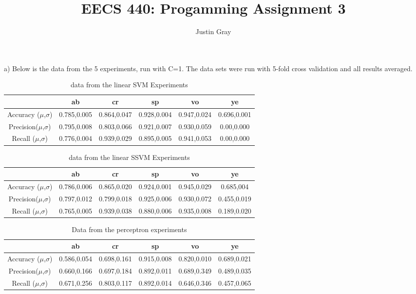 \documentclass[12pt]{article}
\title{EECS 440: Progamming Assignment 3}
\author{Justin Gray}
\begin{document}
\maketitle

a) Below is the data from the 5 experiments, run with C=1. The data sets were run with 
5-fold cross validation and all results averaged. 
\begin{table}[ht!]
    \begin{tabular}{|c|c|c|c|c|c|} \hline
                             & ab            & cr            & sp              & vo              & ye\\ \hline
    Accuracy ($\mu$,$\sigma$)& 0.785,0.005 & 0.864,0.047 & 0.928,0.004   & 0.947,0.024   &0.696,0.001\\ \hline
    Precision($\mu$,$\sigma$)& 0.795,0.008 & 0.803,0.066 & 0.921,0.007   & 0.930,0.059   &0.00,0.000\\ \hline
    Recall   ($\mu$,$\sigma$)& 0.776,0.004 & 0.939,0.029 & 0.895,0.005   & 0.941,0.053   &0.00,0.000\\ \hline  
    \hline
    \end{tabular}
    \caption{data from the linear SVM Experiments}
\end{table}

\begin{table}[ht!]
    \begin{tabular}{|c|c|c|c|c|c|} \hline
                             & ab            & cr            & sp              & vo              & ye\\ \hline
    Accuracy ($\mu$,$\sigma$)& 0.786,0.006 & 0.865,0.020 & 0.924,0.001   & 0.945,0.029   &0.685,004\\ \hline
    Precision($\mu$,$\sigma$)& 0.797,0.012 & 0.799,0.018 & 0.925,0.006   & 0.930,0.072   &0.455,0.019\\ \hline
    Recall   ($\mu$,$\sigma$)& 0.765,0.005 & 0.939,0.038 & 0.880,0.006   & 0.935,0.008   &0.189,0.020\\ \hline  
    \hline
    \end{tabular}
    \caption{data from the linear SSVM Experiments}
\end{table}


\begin{table}[ht!]
    \begin{tabular}{|c|c|c|c|c|c|} \hline
                             & ab            & cr            & sp              & vo              & ye\\ \hline
    Accuracy ($\mu$,$\sigma$)& 0.586,0.054 & 0.698,0.161 & 0.915,0.008   & 0.820,0.010   &0.689,0.021\\ \hline
    Precision($\mu$,$\sigma$)& 0.660,0.166 & 0.697,0.184 & 0.892,0.011   & 0.689,0.349   &0.489,0.035\\ \hline
    Recall   ($\mu$,$\sigma$)& 0.671,0.256 & 0.803,0.117 & 0.892,0.014   & 0.646,0.346   &0.457,0.065\\ \hline  
    \hline
    \end{tabular}
    \caption{Data from the perceptron experiments}
\end{table}
\end{document}
